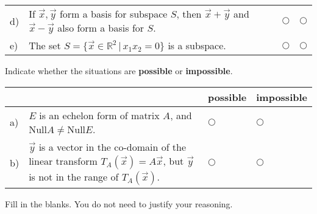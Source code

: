\documentclass[12pt]{exam}
\newcommand{\Nul}{\text{Null}}
\begin{document}
\begin{questions}
\begin{center}
\begin{tabular}{ p{.15cm} p{14.5cm} p{.5cm} p{.6cm} }
        d) & If $\vec x, \vec y$ form a basis for subspace $S$, then $\vec x + \vec y$ and $\vec x - \vec y$ also form a basis for $S$.  & $\bigcirc$  & $\bigcirc$ \\ 

        e) & The set $S=\{\vec x \in \mathbb R^2 \, | \, x_1x_2 =0\}$ is a subspace. & $\bigcirc$  & $\bigcirc$  
        \\[1pt] \hline
        
    \end{tabular}
    \end{center}
    \setlength{\extrarowheight}{0.0cm}

\question[2] Indicate whether the situations are \textbf{possible} or \textbf{impossible}.

    \vspace{-0.8cm}
    \setlength{\extrarowheight}{0.25cm}
    \begin{center}
    \hspace{-.9cm}\begin{tabular}{ p{.2cm} p{10cm} p{1.4cm} p{1.75cm} }
        
        & & possible &  impossible  \\[2pt] \hline 
        
        
        a) & $E$ is an echelon form of matrix $A$, and $\Nul A \ne \Nul E$. & $\bigcirc$  & $\bigcirc$ \\ 
                

        b) & $\vec y$ is a vector in the co-domain of the linear transform $T_A(\vec x) = A\vec x$, but $\vec y$ is not in the range of $T_A(\vec x)$. & $\bigcirc$  & $\bigcirc$ \\[4pt] \hline
        
    \end{tabular}
    \end{center}
    \setlength{\extrarowheight}{0.0cm}
    \vspace{-6pt} 

    \question[4] Fill in the blanks. You do not need to justify your reasoning. 
    \begin{parts}

\end{parts}
\end{questions}
\end{document}
